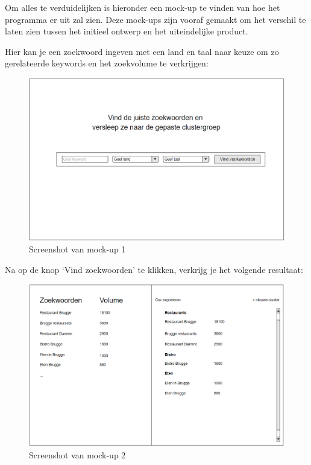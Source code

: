 Om alles te verduidelijken is hieronder een mock-up te vinden van hoe het programma er uit zal zien. Deze mock-ups zijn vooraf gemaakt om het verschil te laten zien tussen het initieel ontwerp en het uiteindelijke product. 

Hier kan je een zoekwoord ingeven met een land en taal naar keuze om zo gerelateerde keywords en het zoekvolume te verkrijgen: 

\begin{figure}[h!]
\centering
\includegraphics[width=\linewidth]{img/Mockup.png}
\caption{Screenshot van mock-up 1}
\end{figure}

Na op de knop ‘Vind zoekwoorden’ te klikken, verkrijg je het volgende resultaat: 

\begin{figure}[h!]
\centering
\includegraphics[width=\linewidth]{img/Mockup2.png}
\caption{Screenshot van mock-up 2}
\end{figure}

